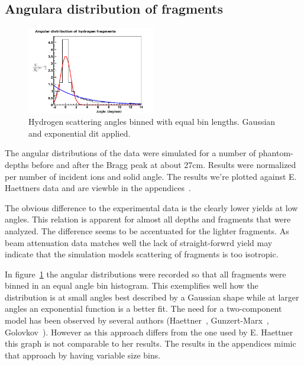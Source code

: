 \subsection{Angulara distribution of fragments}
\begin{figure}[!h] 
\begin{center}
\includegraphics[width=0.5\textwidth]{images/plots/angularDistributions/equlBinnedHydrogen279.png}  
\caption{\label{fig:binnedHydrogen} Hydrogen scattering angles binned with equal bin lengths. Gaussian and exponential dit applied.}
 \end{center}
 \end{figure}
The angular distributions of the data were simulated for a number of phantom-depths before and after the Bragg peak at about 27cm. Results were normalized per number of incident ions and solid angle. The results we're plotted against E. Haettners data and are viewble in the appendices~\cite{AngularDistributionAppendix}.

The obvious difference to the experimental data is the clearly lower yields at low angles. This relation is apparent for almost all depths and fragments that were analyzed. The difference seems to be accentuated for the lighter fragments.  As beam attenuation data matches well the lack of straight-forwrd yield may indicate that the simulation models scattering of fragments is too isotropic.

In figure~\ref{fig:binnedHydrogen} the angular distributions were recorded so that all fragments were binned in an equal angle bin histogram. This exemplifies well how the distribution is at small angles best described by a Gaussian shape while at larger angles an exponential function is a better fit. The need for a two-component model has been observed by several authors (Haettner~\cite{ehaettner}, Gunzert-Marx~\cite{gunzert-marx}, Golovkov~\cite{golovkov}). However as this approach differs from the one used by E. Haettner this graph is not comparable to her results. The results in the appendices mimic that approach by having variable size bins.

